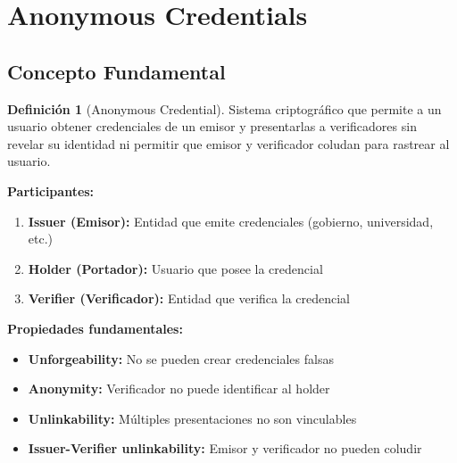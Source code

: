 \documentclass[11pt,a4paper,twoside]{book}
\theoremstyle{definition}
\newtheorem{definition}{Definición}[chapter]
\theoremstyle{remark}
\begin{document}
\section{Anonymous Credentials}
\label{sec:anonymous-credentials}

\subsection{Concepto Fundamental}

\begin{definition}[Anonymous Credential]
Sistema criptográfico que permite a un usuario obtener credenciales de un emisor y presentarlas a verificadores sin revelar su identidad ni permitir que emisor y verificador coludan para rastrear al usuario.

\textbf{Participantes:}
\begin{enumerate}
    \item \textbf{Issuer (Emisor):} Entidad que emite credenciales (gobierno, universidad, etc.)
    \item \textbf{Holder (Portador):} Usuario que posee la credencial
    \item \textbf{Verifier (Verificador):} Entidad que verifica la credencial
\end{enumerate}

\textbf{Propiedades fundamentales:}
\begin{itemize}
    \item \textbf{Unforgeability:} No se pueden crear credenciales falsas
    \item \textbf{Anonymity:} Verificador no puede identificar al holder
    \item \textbf{Unlinkability:} Múltiples presentaciones no son vinculables
    \item \textbf{Issuer-Verifier unlinkability:} Emisor y verificador no pueden coludir
\end{itemize}
\end{definition}
\end{document}
